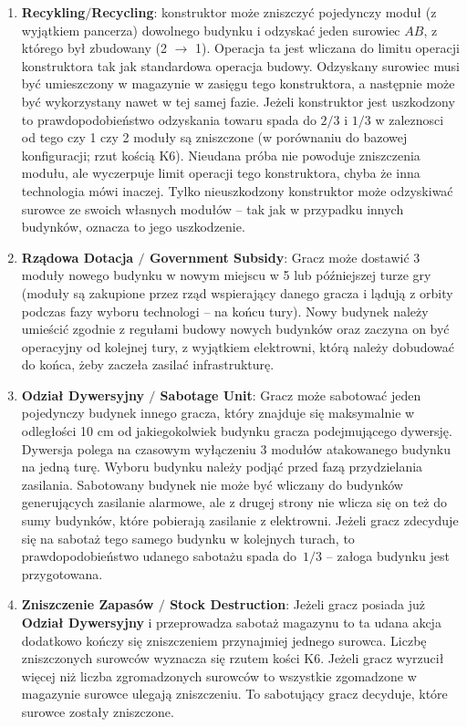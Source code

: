 \documentclass[11pt,a4paper]{article}
\begin{document}
\begin{enumerate}
\item \textbf{Recykling$/$Recycling}: konstruktor może zniszczyć pojedynczy moduł (z wyjątkiem pancerza) dowolnego budynku i odzyskać jeden surowiec $AB$, z którego był zbudowany (2 $\to$ 1). Operacja ta jest wliczana do limitu operacji konstruktora tak jak standardowa operacja budowy. Odzyskany surowiec musi być umieszczony w magazynie w zasięgu tego konstruktora, a następnie może być wykorzystany nawet w tej samej fazie. Jeżeli konstruktor jest uszkodzony to prawdopodobieństwo odzyskania towaru spada do $2/3$ i $1/3$ w zaleznosci od tego czy 1 czy 2 moduły są zniszczone (w porównaniu do bazowej konfiguracji; rzut kością K6). Nieudana próba nie powoduje zniszczenia modułu, ale wyczerpuje limit operacji tego konstruktora, chyba że inna technologia mówi inaczej. Tylko nieuszkodzony konstruktor może odzyskiwać surowce ze swoich własnych modułów -- tak jak w przypadku innych budynków, oznacza to jego uszkodzenie.
\item \textbf{Rządowa Dotacja $/$ Government Subsidy}: Gracz może dostawić 3 moduły nowego budynku w nowym miejscu w 5 lub późniejszej turze gry (moduły są zakupione przez rząd wspierający danego gracza i lądują z orbity podczas fazy wyboru technologi -- na końcu tury). Nowy budynek należy umieścić zgodnie z regułami budowy nowych budynków oraz zaczyna on być operacyjny od kolejnej tury, z wyjątkiem elektrowni, którą należy dobudować do końca, żeby zaczeła zasilać infrastrukturę.
\item \textbf{Odział Dywersyjny $/$ Sabotage Unit}: Gracz może sabotować jeden pojedynczy budynek innego gracza, który znajduje się maksymalnie w odległości 10 cm od jakiegokolwiek budynku gracza podejmującego dywersję. Dywersja polega na czasowym wyłączeniu 3 modułów atakowanego budynku na jedną turę. Wyboru budynku należy podjąć przed fazą przydzielania zasilania. Sabotowany budynek nie może być wliczany do budynków generujących zasilanie alarmowe, ale z drugej strony nie wlicza się on też do sumy budynków, które pobierają zasilanie z elektrowni. Jeżeli gracz zdecyduje się na sabotaż tego samego budynku w kolejnych turach, to prawdopodobieństwo udanego sabotażu spada do~$1/3$ -- załoga budynku jest przygotowana.
\item \textbf{Zniszczenie Zapasów $/$ Stock Destruction}: Jeżeli gracz posiada już \textbf{Odział Dywersyjny} i przeprowadza sabotaż magazynu to ta udana akcja dodatkowo kończy się zniszczeniem przynajmiej jednego surowca. Liczbę zniszczonych surowców wyznacza się rzutem kości K6. Jeżeli gracz wyrzucił więcej niż liczba zgromadzonych surowców to wszystkie zgomadzone w magazynie surowce ulegają zniszczeniu. To sabotujący gracz decyduje, które surowce zostały zniszczone.  

\end{enumerate}
\end{document}

